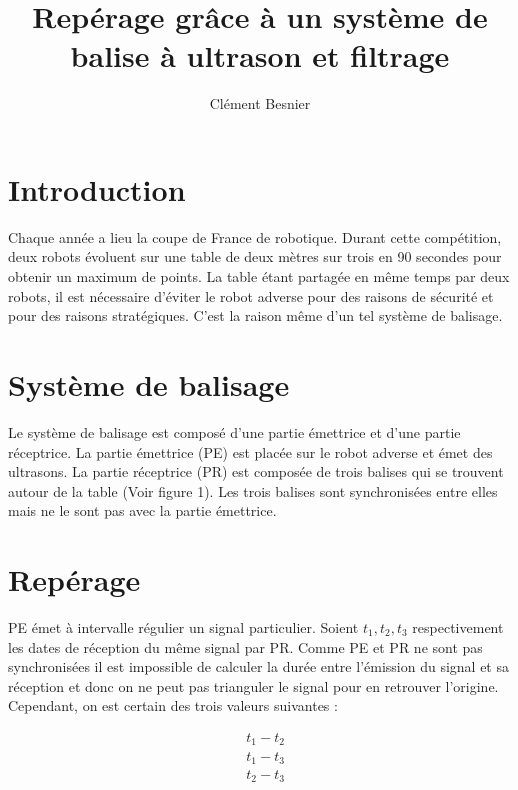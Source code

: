 \documentclass[a4paper, 8pt]{article}
\title{Repérage grâce à un système de balise à ultrason et filtrage}
\author{Clément Besnier}
\begin{document}
\maketitle
\tableofcontents
\section{Introduction}

Chaque année a lieu la coupe de France de robotique. Durant cette compétition, deux robots évoluent sur une table de deux mètres sur trois en 90 secondes pour obtenir un maximum de points. La table étant partagée en même temps par deux robots, il est nécessaire d'éviter le robot adverse pour des raisons de sécurité et pour des raisons stratégiques. C'est la raison même d'un tel système de balisage.



\section{Système de balisage}

Le système de balisage est composé d'une partie émettrice et d'une partie réceptrice. La partie émettrice (PE) est placée sur le robot adverse et émet des ultrasons. La partie réceptrice (PR) est composée de trois balises qui se trouvent autour de la table (Voir figure 1). Les trois balises sont synchronisées entre elles mais ne le sont pas avec la partie émettrice. 

\section{Repérage}

PE émet à intervalle régulier un signal particulier. Soient $ t_{1}, t_{2}, t_{3}$  respectivement les dates de réception du même signal par PR. Comme PE et PR ne sont pas synchronisées il est impossible de calculer la durée entre l'émission du signal et sa réception et donc on ne peut pas trianguler le signal pour en retrouver l'origine. Cependant, on est certain des trois valeurs suivantes : 


\begin{equation}\label{1}
		\begin{split}
		& t_{1} - t_{2}\\
		& t_{1} - t_{3}\\
		& t_{2} - t_{3}
		\end{split}
\end{equation}
\end{document}
